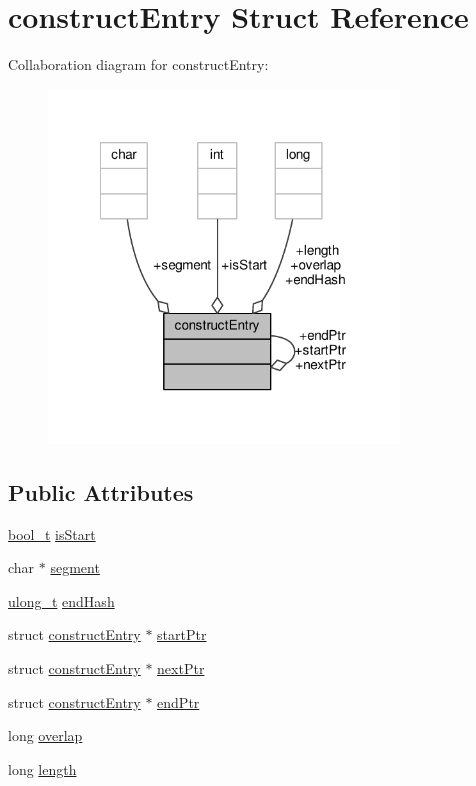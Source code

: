 \hypertarget{structconstructEntry}{\section{construct\-Entry Struct Reference}
\label{structconstructEntry}
}


Collaboration diagram for construct\-Entry\-:
\nopagebreak
\begin{figure}[H]
\begin{center}
\leavevmode
\includegraphics[width=264pt]{structconstructEntry__coll__graph}
\end{center}
\end{figure}
\subsection*{Public Attributes}
\begin{DoxyCompactItemize}
\item 
\hyperlink{portable__defns_8h_a812d16e5494522586b3784e55d479912}{bool\-\_\-t} \hyperlink{structconstructEntry_a54e2245ccb62d9e1200c2e2ca1609837}{is\-Start}
\item 
char $\ast$ \hyperlink{structconstructEntry_aab22682576220f3efee928a9fac21ad4}{segment}
\item 
\hyperlink{types_8h_a95c0f4cc152cbacf72a7d70d7077dc96}{ulong\-\_\-t} \hyperlink{structconstructEntry_abad5b7a2439647fec74a952e2313c72e}{end\-Hash}
\item 
struct \hyperlink{structconstructEntry}{construct\-Entry} $\ast$ \hyperlink{structconstructEntry_a9d822529ef8a6b557ea42d986906d496}{start\-Ptr}
\item 
struct \hyperlink{structconstructEntry}{construct\-Entry} $\ast$ \hyperlink{structconstructEntry_a014aabd66ca855b00e0285a241aeb5e9}{next\-Ptr}
\item 
struct \hyperlink{structconstructEntry}{construct\-Entry} $\ast$ \hyperlink{structconstructEntry_a1cd345344bca9d0dfea1becdbd88173a}{end\-Ptr}
\item 
long \hyperlink{structconstructEntry_a709851c75b4302d62e9438ec88a0603c}{overlap}
\item 
long \hyperlink{structconstructEntry_abb8eec52a4f6d3d4afec6a96895cd1c5}{length}
\end{DoxyCompactItemize}


